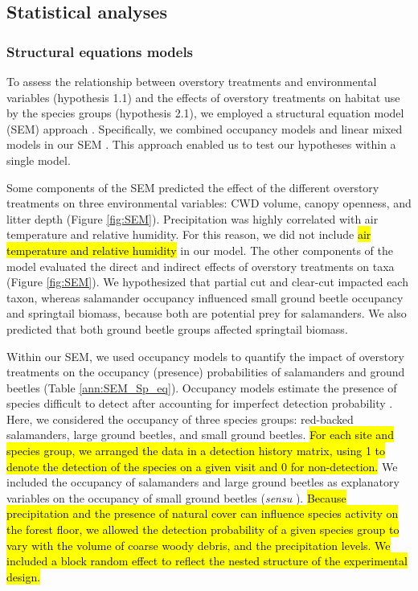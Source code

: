 \subsection*{Statistical analyses}
\label{subsec:analyses}

\subsubsection{Structural equations models} 

To assess the relationship between overstory treatments and environmental variables (hypothesis 1.1) and the effects of overstory treatments on habitat use by the species groups (hypothesis 2.1), 
we employed a structural equation model (SEM) approach \citep{graceSpecificationStructuralEquation2010}. 
Specifically, we combined occupancy models and linear mixed models in our SEM \citep{mackenzieOccupancyEstimationModeling2006a,graceSpecificationStructuralEquation2010,josephIntegratingOccupancyModels2016}.
This approach enabled us to test our hypotheses within a single model. 

Some components of the SEM predicted the effect of the different overstory treatments on three environmental variables: CWD volume, canopy openness, and litter depth (Figure \ref{fig:SEM}). 
Precipitation was highly correlated with air temperature and relative humidity. 
For this reason, we did not include \hl{air temperature and relative humidity} in our model. 
The other components of the model evaluated the direct and indirect effects of overstory treatments on taxa (Figure \ref{fig:SEM}). 
We hypothesized that partial cut and clear-cut impacted each taxon, whereas salamander occupancy influenced small ground beetle occupancy and springtail biomass, because both are potential prey for salamanders. 
We also predicted that both ground beetle groups affected springtail biomass.

Within our SEM, we used occupancy models to quantify the impact of overstory treatments on the occupancy (presence) probabilities of salamanders and ground beetles (Table \ref{ann:SEM_Sp_eq}). 
Occupancy models estimate the presence of species difficult to detect after accounting for imperfect detection probability \citep{mackenzieEstimatingSiteOccupancy2002,baileyEstimatingSiteOccupancy2004,mazerolleMakingGreatLeaps2007,spiersEstimatingSpeciesMisclassification2022}. 
Here, we considered the occupancy of three species groups: red-backed salamanders, large ground beetles, and small ground beetles. 
\hl{For each site and species group, we arranged the data in a detection history matrix, using 1 to denote the detection of the species on a given visit and 0 for non-detection. }
We included the occupancy of salamanders and large ground beetles as explanatory variables on the occupancy of small ground beetles (\textit{sensu} \cite{Feldman2023Beaveractivity}). 
\hl{Because precipitation and the presence of natural cover can influence species activity on the forest floor, 
we allowed the detection probability of a given species group to vary with the volume of coarse woody debris, and the precipitation levels. 
We included a block random effect to reflect the nested structure of the experimental design. }


